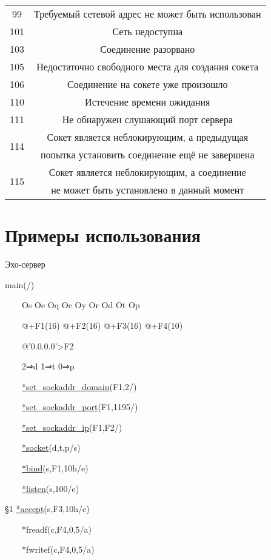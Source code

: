 \documentclass[12t,english,russian]{article}
\begin{document}
\begin{center}
\begin{longtable}{|c|c|}
99 & Требуемый сетевой адрес не может быть использован\\
101 & Сеть недоступна\\
\hline
103 & Соединение разорвано\\
105 & Недостаточно свободного места для создания сокета\\
106 & Соединение на сокете уже произошло\\
110 & Истечение времени ожидания\\
111 & Не обнаружен слушающий порт сервера\\
\multirow{2}{*}{114} & Сокет является неблокирующим, а предыдущая\\
& попытка установить соединение ещё не завершена\\
\multirow{2}{*}{115} & Сокет является неблокирующим, а соединение\\
& не может быть установлено в данный момент\\
\hline
\end{longtable}
\end{center}
\section[Примеры использования]{Примеры использования}
\begin{center}
\textcolor[rgb]{1,0,0}{Эхо-сервер}
\end{center}

main(/)

\ \ \ \ Os Oe Oq Oc Oy Or Od Ot Op

\ \ \ \ @+F1(16) @+F2(16) @+F3(16) @+F4(10)

\ \ \ \ @'0.0.0.0'>F2

\ \ \ \ 2⇒d 1⇒t 0⇒p

\ \ \ \ \hyperref[set_sockaddr_domain]{*set\_sockaddr\_domain}(F1,2/)

\ \ \ \ \hyperref[set_sockaddr_port]{*set\_sockaddr\_port}(F1,1195/)

\ \ \ \ \hyperref[set_sockaddr_ip]{*set\_sockaddr\_ip}(F1,F2/)

\ \ \ \ \hyperref[socket]{*socket}(d,t,p/s)

\ \ \ \ \hyperref[bind]{*bind}(s,F1,10h/e)

\ \ \ \ \hyperref[listen]{*listen}(s,100/e)

§1 \hyperref[accept]{*accept}(s,F3,10h/c)

\ \ \ \ *freadf(c,F4,0,5/a)	

\ \ \ \ *fwritef(c,F4,0,5/a)
\end{document}
